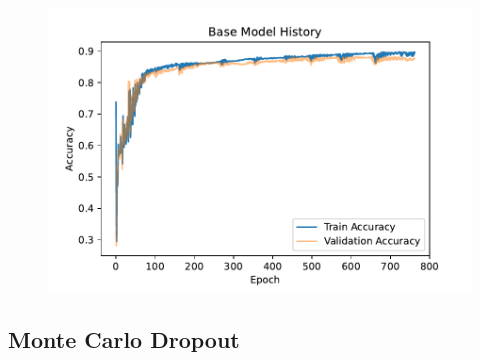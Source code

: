 \documentclass[11pt,twoside]{article}
\numberwithin{Theorem}{section}
\numberwithin{Definition}{section}
\numberwithin{Lemma}{section}
\numberwithin{Algorithm}{section}
\numberwithin{equation}{section}
\begin{document}
\vspace*{1em}
\begin{figure}[!h]
\centering
\includegraphics[width=\textwidth]{./output/2.a.history-base.pdf}
\caption{}
\label{fig:base}
\end{figure}
\vspace{2em}


\subsection{Monte Carlo Dropout}
\label{sec:BNN}
\blindtext



\end{document}
